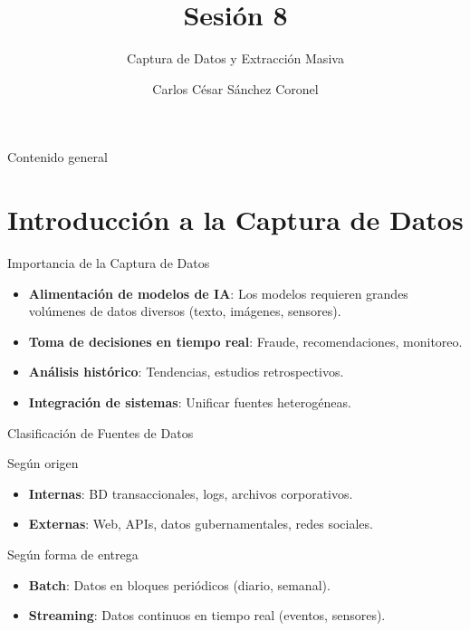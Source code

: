 \documentclass[aspectratio=169, 10pt, xcolor=table]{beamer}
\title[SESIÓN 8 BBDD]{\textbf{Sesión 8}}
\subtitle{Captura de Datos y Extracción Masiva}
\author[Prof. C. Sánchez]{Carlos César Sánchez Coronel}
\institute{\textbf{BASES DE DATOS}}
\date{}
\begin{document}
\begin{frame}
    \titlepage
\end{frame}

\begin{frame}{Contenido general}
    \tableofcontents
\end{frame}

\section{Introducción a la Captura de Datos}

\begin{frame}{Importancia de la Captura de Datos}
    \begin{itemize}
        \item \textbf{Alimentación de modelos de IA}: Los modelos requieren grandes volúmenes de datos diversos (texto, imágenes, sensores).
        \item \textbf{Toma de decisiones en tiempo real}: Fraude, recomendaciones, monitoreo.
        \item \textbf{Análisis histórico}: Tendencias, estudios retrospectivos.
        \item \textbf{Integración de sistemas}: Unificar fuentes heterogéneas.
    \end{itemize}
\end{frame}

\begin{frame}{Clasificación de Fuentes de Datos}
    \begin{block}{Según origen}
        \begin{itemize}
            \item \textbf{Internas}: BD transaccionales, logs, archivos corporativos.
            \item \textbf{Externas}: Web, APIs, datos gubernamentales, redes sociales.
        \end{itemize}
    \end{block}
    \begin{block}{Según forma de entrega}
        \begin{itemize}
            \item \textbf{Batch}: Datos en bloques periódicos (diario, semanal).
            \item \textbf{Streaming}: Datos continuos en tiempo real (eventos, sensores).
        \end{itemize}
    \end{block}
\end{frame}
\end{document}
